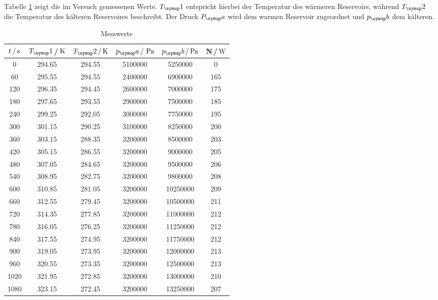 Tabelle \ref{tab:messwerte} zeigt die im Versuch gemessenen Werte.
$T_\su{1}$ entspricht hierbei der Temperatur des wärmeren Reservoirs, während $T_\su{2}$
die Temperatur des kälteren Reservoires beschreibt. Der Druck $P_\su{a}$ wird dem warmen Reservoir
zugeordnet und $p_\su{b}$ dem kälteren.
\begin{table}[h]
  \centering
  \begin{tabular}{c c c c c c}
    \toprule
    $t\,/\,\si{\second}$ &$T_\su{1}$\,/$\,\si{\kelvin}$ & $T_\su{2}\,/\Kel$ & $p_\su{a}\,/\,\pas $ &
    $p_\su{b}\,/ \pas$ & N\,/$\,\si{\watt}$  \\
    \midrule
       0   &   294.65   &   294.55   &   5100000    &     5250000   &      0 \\
      60   &   295.55   &   294.55   &   2400000    &     6900000   &    165 \\
     120   &   296.35   &   294.45   &   2600000    &     7000000   &    175 \\
     180   &   297.65   &   293.55   &   2900000    &     7500000   &    185 \\
     240   &   299.25   &   292.05   &   3000000    &     7750000   &    195 \\
     300   &   301.15   &   290.25   &   3100000    &     8250000   &    200 \\
     360   &   303.15   &   288.35   &   3200000    &     8500000   &    203 \\
     420   &   305.15   &   286.55   &   3200000    &     9000000   &    205 \\
     480   &   307.05   &   284.65   &   3200000    &     9500000   &    206 \\
     540   &   308.95   &   282.75   &   3200000    &     9800000   &    208 \\
     600   &   310.85   &   281.05   &   3200000    &    10250000   &    209 \\
     660   &   312.55   &   279.45   &   3200000    &    10500000   &    211 \\
     720   &   314.35   &   277.85   &   3200000    &    11000000   &    212 \\
     780   &   316.05   &   276.25   &   3200000    &    11250000   &    212 \\
     840   &   317.55   &   274.95   &   3200000    &    11750000   &    212 \\
     900   &   319.05   &   273.95   &   3200000    &    12000000   &    213 \\
     960   &   320.55   &   273.35   &   3200000    &    12500000   &    213 \\
    1020   &   321.95   &   272.85   &   3200000    &    13000000   &    210 \\
    1080   &   323.15   &   272.45   &   3200000    &    13250000   &    207 \\
    \bottomrule
  \end{tabular}
  \caption{Messwerte}
  \label{tab:messwerte}
\end{table}
